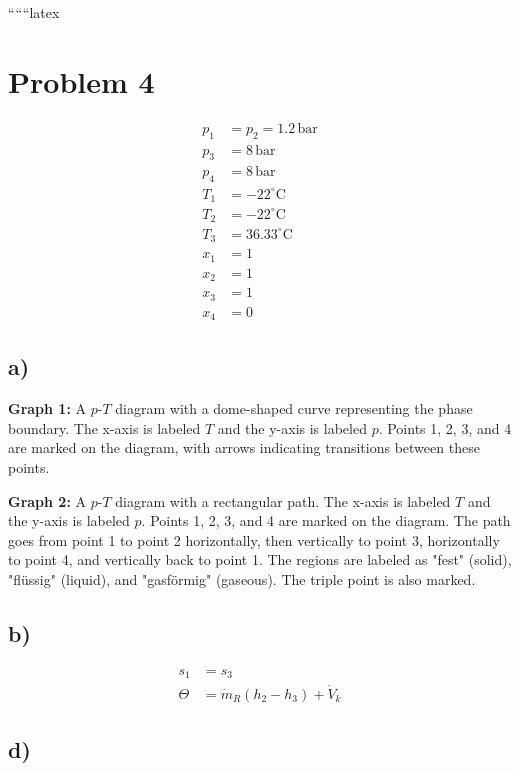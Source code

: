
``````latex


\section*{Problem 4}

\begin{align*}
p_1 &= p_2 = 1.2 \, \text{bar} \\
p_3 &= 8 \, \text{bar} \\
p_4 &= 8 \, \text{bar} \\
T_1 &= -22^\circ \text{C} \\
T_2 &= -22^\circ \text{C} \\
T_3 &= 36.33^\circ \text{C} \\
x_1 &= 1 \\
x_2 &= 1 \\
x_3 &= 1 \\
x_4 &= 0
\end{align*}

\subsection*{a)}

\textbf{Graph 1:} A $p$-$T$ diagram with a dome-shaped curve representing the phase boundary. The x-axis is labeled $T$ and the y-axis is labeled $p$. Points 1, 2, 3, and 4 are marked on the diagram, with arrows indicating transitions between these points.

\textbf{Graph 2:} A $p$-$T$ diagram with a rectangular path. The x-axis is labeled $T$ and the y-axis is labeled $p$. Points 1, 2, 3, and 4 are marked on the diagram. The path goes from point 1 to point 2 horizontally, then vertically to point 3, horizontally to point 4, and vertically back to point 1. The regions are labeled as "fest" (solid), "flüssig" (liquid), and "gasförmig" (gaseous). The triple point is also marked.

\subsection*{b)}

\begin{align*}
s_1 &= s_3 \\
\Theta &= \dot{m}_R (h_2 - h_3) + \dot{V}_k
\end{align*}

\subsection*{d)}

